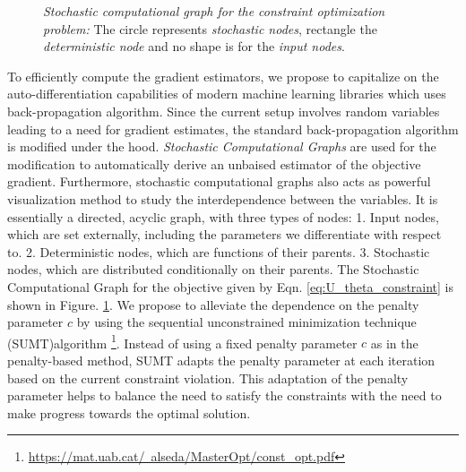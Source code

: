 \begin{figure}
\centering
{}
\caption{\emph{Stochastic computational graph for the constraint optimization problem:} The circle represents \textit{stochastic nodes}, rectangle the \textit{deterministic node} and no shape is for the \textit{input nodes}. }
\label{fig:stochastic graph}
\end{figure}
To efficiently compute the gradient estimators, we propose to capitalize on the auto-differentiation capabilities of modern machine learning libraries which uses back-propagation algorithm. Since the current setup involves random variables leading to a need for gradient estimates, the standard back-propagation algorithm is modified under the hood. \textit{Stochastic Computational Graphs} \cite{schulman_gradient_2016} are used for the modification to automatically derive an unbaised estimator of the objective gradient. Furthermore, stochastic computational graphs also acts as powerful visualization method to study the interdependence between the variables. It is essentially a directed, acyclic graph, with three types of nodes: 1. Input nodes, which are set externally, including the parameters we differentiate with respect to. 2. Deterministic nodes, which are functions of their parents. 3. Stochastic nodes, which are distributed conditionally on their parents. The Stochastic Computational Graph for the objective given by Eqn. \ref{eq:U_theta_constraint} is shown in Figure. \ref{fig:stochastic graph}.
%
We propose to alleviate the dependence on the penalty parameter $c$ by using the sequential unconstrained minimization technique (SUMT)algorithm \cite{fiacco1990nonlinear}\footnote{\href{https://mat.uab.cat/~alseda/MasterOpt/const_opt.pdf}{https://mat.uab.cat/~alseda/MasterOpt/const\_opt.pdf}}. Instead of using a fixed penalty parameter $c$ as in the penalty-based method, SUMT adapts the penalty parameter at each iteration based on the current constraint violation. This adaptation of the penalty parameter helps to balance the need to satisfy the constraints with the need to make progress towards the optimal solution. 

